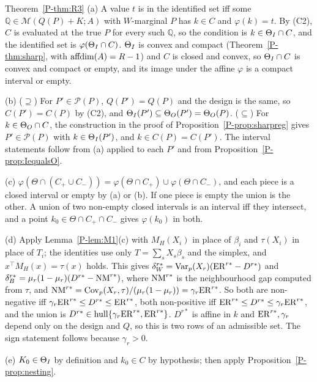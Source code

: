 \begin{proofof}{Theorem~\ref{P-thm:R3}}
(a) A value $t$ is in the identified set iff some $\mathbb Q\in\mathcal M(Q(P)+K;A)$ with
$W$-marginal $P$ has $k\in C$ and $\varphi(k)=t$. By (C2), $C$ is evaluated at the true
$P$ for every such $\mathbb Q$, so the condition is $k\in\Theta_I\cap C$, and the identified
set is $\varphi(\Theta_I\cap C)$. $\Theta_I$ is convex and compact (Theorem~\ref{P-thm:sharp},
with $\operatorname{affdim}(A)=R-1$) and $C$ is closed and convex, so $\Theta_I\cap C$ is convex and
compact or empty, and its image under the affine $\varphi$ is a compact interval or
empty.

(b) ($\supseteq$) For $P'\in\mathcal P(P)$, $Q(P')=Q(P)$ and the design is the same, so
$C(P')=C(P)$ by (C2), and $\Theta_I(P')\subseteq\Theta_O(P')=\Theta_O(P)$. ($\subseteq$) For
$k\in\Theta_O\cap C$, the construction in the proof of Proposition~\ref{P-prop:sharpreg} gives
$P'\in\mathcal P(P)$ with $k\in\Theta_I(P')$, and $k\in C(P)=C(P')$. The interval statements
follow from (a) applied to each $P'$ and from Proposition~\ref{P-prop:IequalsO}.

(c) $\varphi(\Theta\cap(C_+\cup C_-))=\varphi(\Theta\cap C_+)\cup\varphi(\Theta\cap C_-)$, and
each piece is a closed interval or empty by (a) or (b). If one piece is empty the
union is the other. A union of two non-empty closed intervals is an interval iff they
intersect, and a point $k_0\in\Theta\cap C_+\cap C_-$ gives $\varphi(k_0)$ in both.

(d) Apply Lemma~\ref{P-lem:M1}(c) with $M_H(X_i)$ in place of $\beta_i$ and $\tau(X_i)$ in
place of $T_i$; the identities use only $T=\sum_sX_s\beta_s$ and the simplex, and
$x^\top M_H(x)=\tau(x)$ holds. This gives
$\delta^{r*}_W=\operatorname{Var}_p(X_r)(\mathrm{ER}^{r*}-D^{r*})$ and
$\delta^{r*}_B=\mu_r(1-\mu_r)(D^{r*}-\mathrm{NM}^{r*})$, where $\mathrm{NM}^{r*}$ is the neighbourhood gap
computed from $\tau$, and $\mathrm{NM}^{r*}=\operatorname{Cov}_p(X_r,\tau)/(\mu_r(1-\mu_r))=\gamma_r\mathrm{ER}^{r*}$. So
both are non-negative iff $\gamma_r\mathrm{ER}^{r*}\le D^{r*}\le\mathrm{ER}^{r*}$, both non-positive iff
$\mathrm{ER}^{r*}\le D^{r*}\le\gamma_r\mathrm{ER}^{r*}$, and the union is
$D^{r*}\in\operatorname{hull}\{\gamma_r\mathrm{ER}^{r*},\mathrm{ER}^{r*}\}$. $D^{r*}$ is affine in $k$ and
$\mathrm{ER}^{r*},\gamma_r$ depend only on the design and $Q$, so this is two rows of an
admissible set. The sign statement follows because $\gamma_r>0$.

(e) $K_0\in\Theta_I$ by definition and $k_0\in C$ by hypothesis; then apply
Proposition~\ref{P-prop:nesting}.
\end{proofof}

